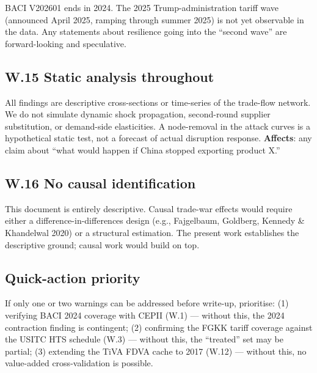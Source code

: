 \documentclass[11pt,a4paper]{article}
\begin{document}
\begin{warnbox}
BACI V202601 ends in 2024. The 2025 Trump-administration tariff wave
(announced April 2025, ramping through summer 2025) is not yet
observable in the data. Any statements about resilience going into the
``second wave'' are forward-looking and speculative.
\end{warnbox}

\subsection*{W.15 Static analysis throughout}

\begin{warnbox}
All findings are descriptive cross-sections or time-series of the
trade-flow network. We do not simulate dynamic shock propagation, second-round
supplier substitution, or demand-side elasticities.
A node-removal in the attack curves is a hypothetical static test, not
a forecast of actual disruption response.
\textbf{Affects}: any claim about ``what would happen if China
stopped exporting product X.''
\end{warnbox}

\subsection*{W.16 No causal identification}

\begin{warnbox}
This document is entirely descriptive. Causal trade-war effects would
require either a difference-in-differences design
(e.g., Fajgelbaum, Goldberg, Kennedy \& Khandelwal 2020) or a
structural estimation. The present work establishes the descriptive
ground; causal work would build on top.
\end{warnbox}

\subsection*{Quick-action priority}

If only one or two warnings can be addressed before write-up, prioritise:
(1) verifying BACI 2024 coverage with CEPII (W.1) — without this, the
2024 contraction finding is contingent;
(2) confirming the FGKK tariff coverage against the USITC HTS schedule
(W.3) — without this, the ``treated'' set may be partial;
(3) extending the TiVA FDVA cache to 2017 (W.12) — without this, no
value-added cross-validation is possible.

\end{document}
